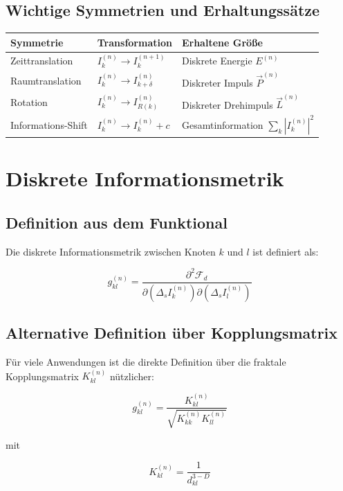 \subsection{Wichtige Symmetrien und Erhaltungssätze}
\label{sub:mathematik_symmetrien_tabelle}

\begin{tabular}{|l|l|l|}
\hline
\textbf{Symmetrie} & \textbf{Transformation} & \textbf{Erhaltene Größe} \\
\hline
Zeittranslation & \(I_k^{(n)} \to I_k^{(n+1)}\) & Diskrete Energie \(E^{(n)}\) \\
Raumtranslation & \(I_k^{(n)} \to I_{k+\delta}^{(n)}\) & Diskreter Impuls \(\vec{P}^{(n)}\) \\
Rotation & \(I_k^{(n)} \to I_{R(k)}^{(n)}\) & Diskreter Drehimpuls \(\vec{L}^{(n)}\) \\
Informations-Shift & \(I_k^{(n)} \to I_k^{(n)} + c\) & Gesamtinformation \(\sum_k |I_k^{(n)}|^2\) \\
\hline
\end{tabular}

\section{Diskrete Informationsmetrik}
\label{app:mathematik_metrik}

\subsection{Definition aus dem Funktional}
\label{sub:mathematik_metrik_def}

Die diskrete Informationsmetrik zwischen Knoten \( k \) und \( l \) ist definiert als:

\[
g_{kl}^{(n)} = \frac{\partial^2 \mathcal{F}_d}{\partial (\Delta_s I_k^{(n)}) \partial (\Delta_s I_l^{(n)})}
\]

\subsection{Alternative Definition über Kopplungsmatrix}
\label{sub:mathematik_metrik_kopplung}

Für viele Anwendungen ist die direkte Definition über die fraktale Kopplungsmatrix \( K_{kl}^{(n)} \) nützlicher:

\[
g_{kl}^{(n)} = \frac{K_{kl}^{(n)}}{\sqrt{K_{kk}^{(n)} K_{ll}^{(n)}}}
\]

mit

\[
K_{kl}^{(n)} = \frac{1}{d_{kl}^{3-D}}
\]

